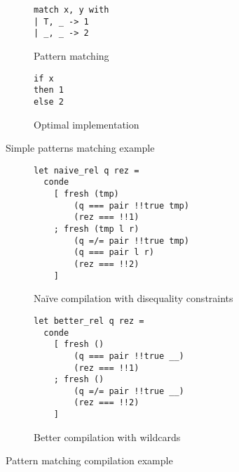 
\begin{figure}[t]
\centering
\begin{subfigure}[t]{0.4\linewidth}
\centering
\begin{lstlisting}[xleftmargin=.7cm,linewidth=3.5cm]
match x, y with
| T, _ -> 1
| _, _ -> 2
\end{lstlisting}
\caption{Pattern matching}
\label{fig:match-example-small-functional}
\end{subfigure}
\hspace{.5cm}
\begin{subfigure}[t]{0.5\linewidth}
\centering
\begin{lstlisting}[xleftmargin=1.7cm,linewidth=3.5cm]
if x 
then 1 
else 2
\end{lstlisting}
\caption{Optimal implementation}
\end{subfigure}
\caption{Simple patterns matching example} 
\label{fig:match-example-small}
\end{figure}

\begin{figure}[t]
\begin{subfigure}[t]{1.0\linewidth}
\centering
\begin{lstlisting}
let naive_rel q rez =
  conde
    [ fresh (tmp) 
        (q === pair !!true tmp) 
        (rez === !!1)
    ; fresh (tmp l r) 
        (q =/= pair !!true tmp) 
        (q === pair l r)
        (rez === !!2) 
    ]
\end{lstlisting}
\caption{Na\"{i}ve compilation with disequality constraints}
\label{fig:match-compilation-small-diseq}
\end{subfigure}
\begin{subfigure}[t]{1.0\linewidth}
\centering
\begin{lstlisting}
let better_rel q rez =
  conde
    [ fresh () 
        (q === pair !!true __) 
        (rez === !!1)
    ; fresh () 
        (q =/= pair !!true __) 
        (rez === !!2) 
    ]
\end{lstlisting}
\caption{Better compilation with wildcards}
\label{fig:match-compilation-small-wc}
\end{subfigure}
\caption{Pattern matching compilation example } 
\label{fig:match-compilation-small}
\end{figure}

